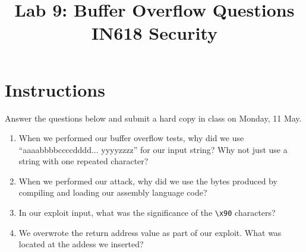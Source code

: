 \documentclass{article}
\begin{document}
\title{ Lab 9: Buffer Overflow Questions \\ IN618 Security}
\maketitle

\section*{Instructions}
Answer the questions below and submit a hard copy in class on Monday, 11 May.

\begin{enumerate}
	\item When we performed our buffer overflow tests, why did we use ``aaaabbbbccccdddd... yyyyzzzz'' for our input string?  Why not just use a string with one repeated character?
	\vspace{40mm}
	\item When we performed our attack, why did we use the bytes produced by compiling and loading our
	assembly language code?
	\vspace{40mm}
	\item In our exploit input, what was the significance of the \texttt{\textbackslash{}x90} characters?
	\vspace{40mm}
	\item We overwrote the return address value as part of our exploit.  What was located at the addess we inserted?
\end{enumerate}
\end{document}
